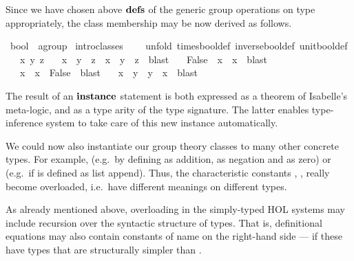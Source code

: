 \begin{isabellebody}
\begin{isamarkuptext}
 \medskip Since we have chosen above ${\mathord{\mathbf{defs}}}$ of the generic group
 operations on type  appropriately, the class membership
  may be now derived as follows.%
\end{isamarkuptext}%
\ bool\ {\isacharcolon}{\isacharcolon}\ agroup\isanewline
{}\ {\isacharparenleft}intro{\isacharunderscore}classes{\isacharcomma}\isanewline
\ \ \ \ unfold\ times{\isacharunderscore}bool{\isacharunderscore}def\ inverse{\isacharunderscore}bool{\isacharunderscore}def\ unit{\isacharunderscore}bool{\isacharunderscore}def{\isacharparenright}\isanewline
\ \ \ x\ y\ z\isanewline
\ \ \ {\isachardoublequote}{\isacharparenleft}{\isacharparenleft}x\ {\isasymnoteq}\ y{\isacharparenright}\ {\isasymnoteq}\ z{\isacharparenright}\ {\isacharequal}\ {\isacharparenleft}x\ {\isasymnoteq}\ {\isacharparenleft}y\ {\isasymnoteq}\ z{\isacharparenright}{\isacharparenright}{\isachardoublequote}\ \ blast\isanewline
\ \ \ {\isachardoublequote}{\isacharparenleft}False\ {\isasymnoteq}\ x{\isacharparenright}\ {\isacharequal}\ x{\isachardoublequote}\ \ blast\isanewline
\ \ \ {\isachardoublequote}{\isacharparenleft}x\ {\isasymnoteq}\ x{\isacharparenright}\ {\isacharequal}\ False{\isachardoublequote}\ \ blast\isanewline
\ \ \ {\isachardoublequote}{\isacharparenleft}x\ {\isasymnoteq}\ y{\isacharparenright}\ {\isacharequal}\ {\isacharparenleft}y\ {\isasymnoteq}\ x{\isacharparenright}{\isachardoublequote}\ \ blast\isanewline
{}%
\begin{isamarkuptext}%
The result of an ${\mathord{\mathbf{instance}}}$ statement is both expressed as a theorem
 of Isabelle's meta-logic, and as a type arity of the type signature.
 The latter enables type-inference system to take care of this new
 instance automatically.

 \medskip We could now also instantiate our group theory classes to
 many other concrete types.  For example, 
 (e.g.\ by defining \isa{{\isasymodot}} as addition, \isa{{\isasyminv}} as negation
 and \isa{{\isasymunit}} as zero) or 
 (e.g.\ if \isa{{\isasymodot}} is defined as list append).  Thus, the
 characteristic constants \isa{{\isasymodot}}, \isa{{\isasyminv}}, \isa{{\isasymunit}}
 really become overloaded, i.e.\ have different meanings on different
 types.%
\end{isamarkuptext}%
%
%
\begin{isamarkuptext}%
As already mentioned above, overloading in the simply-typed HOL
 systems may include recursion over the syntactic structure of types.
 That is, definitional equations  may also
 contain constants of name  on the right-hand side --- if
 these have types that are structurally simpler than \isa{{\isasymtau}}.


\end{isamarkuptext}
\end{isabellebody}
